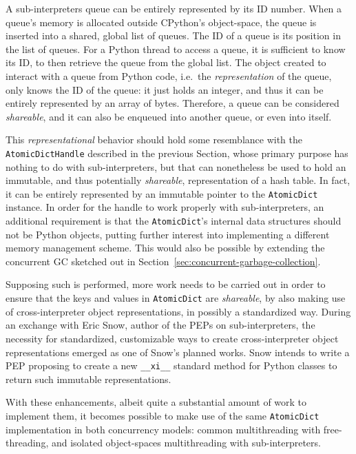 A sub-interpreters queue can be entirely represented by its ID number.
When a queue's memory is allocated outside CPython's object-space, the queue is inserted into a shared, global list of queues.
The ID of a queue is its position in the list of queues.
For a Python thread to access a queue, it is sufficient to know its ID, to then retrieve the queue from the global list.
The object created to interact with a queue from Python code, i.e.\ the \emph{representation} of the queue, only knows the ID of the queue: it just holds an integer, and thus it can be entirely represented by an array of bytes.
Therefore, a queue can be considered \emph{shareable}, and it can also be enqueued into another queue, or even into itself.

This \emph{representational} behavior should hold some resemblance with the \texttt{Atom\-icDictHandle} described in the previous Section, whose primary purpose has nothing to do with sub-interpreters, but that can nonetheless be used to hold an immutable, and thus potentially \emph{shareable}, representation of a hash table.
In fact, it can be entirely represented by an immutable pointer to the \texttt{AtomicDict} instance.
In order for the handle to work properly with sub-interpreters, an additional requirement is that the \texttt{AtomicDict}'s internal data structures should not be Python objects, putting further interest into implementing a different memory management scheme.
This would also be possible by extending the concurrent GC sketched out in Section~\ref{sec:concurrent-garbage-collection}.

Supposing such is performed, more work needs to be carried out in order to ensure that the keys and values in \texttt{AtomicDict} are \emph{shareable}, by also making use of cross-interpreter object representations, in possibly a standardized way.
During an exchange with Eric Snow, author of the PEPs on sub-interpreters, the necessity for standardized, customizable ways to create cross-interpreter object representations emerged as one of Snow's planned works.
Snow intends to write a PEP proposing to create a new \texttt{\_\_xi\_\_} standard method for Python classes to return such immutable representations.

With these enhancements, albeit quite a substantial amount of work to implement them, it becomes possible to make use of the same \texttt{AtomicDict} implementation in both concurrency models: common multithreading with free-threading, and isolated object-spaces multithreading with sub-interpreters.


